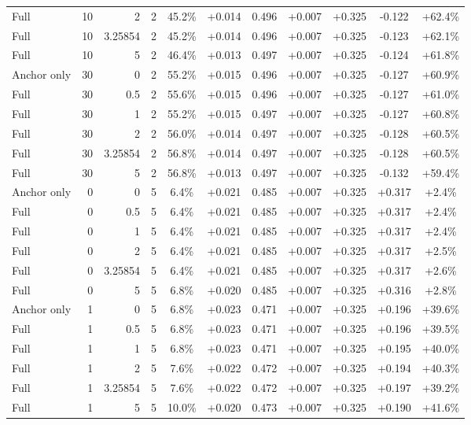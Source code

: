 \begin{table}[htbp]
\begin{tabular}{lrrrccccccc}
Full & 10 & 2 & 2 & 45.2\% & +0.014 & 0.496 & +0.007 & +0.325 & -0.122 & +62.4\% \\
Full & 10 & 3.25854 & 2 & 45.2\% & +0.014 & 0.496 & +0.007 & +0.325 & -0.123 & +62.1\% \\
Full & 10 & 5 & 2 & 46.4\% & +0.013 & 0.497 & +0.007 & +0.325 & -0.124 & +61.8\% \\
Anchor only & 30 & 0 & 2 & 55.2\% & +0.015 & 0.496 & +0.007 & +0.325 & -0.127 & +60.9\% \\
Full & 30 & 0.5 & 2 & 55.6\% & +0.015 & 0.496 & +0.007 & +0.325 & -0.127 & +61.0\% \\
Full & 30 & 1 & 2 & 55.2\% & +0.015 & 0.497 & +0.007 & +0.325 & -0.127 & +60.8\% \\
Full & 30 & 2 & 2 & 56.0\% & +0.014 & 0.497 & +0.007 & +0.325 & -0.128 & +60.5\% \\
Full & 30 & 3.25854 & 2 & 56.8\% & +0.014 & 0.497 & +0.007 & +0.325 & -0.128 & +60.5\% \\
Full & 30 & 5 & 2 & 56.8\% & +0.013 & 0.497 & +0.007 & +0.325 & -0.132 & +59.4\% \\
Anchor only & 0 & 0 & 5 & 6.4\% & +0.021 & 0.485 & +0.007 & +0.325 & +0.317 & +2.4\% \\
Full & 0 & 0.5 & 5 & 6.4\% & +0.021 & 0.485 & +0.007 & +0.325 & +0.317 & +2.4\% \\
Full & 0 & 1 & 5 & 6.4\% & +0.021 & 0.485 & +0.007 & +0.325 & +0.317 & +2.4\% \\
Full & 0 & 2 & 5 & 6.4\% & +0.021 & 0.485 & +0.007 & +0.325 & +0.317 & +2.5\% \\
Full & 0 & 3.25854 & 5 & 6.4\% & +0.021 & 0.485 & +0.007 & +0.325 & +0.317 & +2.6\% \\
Full & 0 & 5 & 5 & 6.8\% & +0.020 & 0.485 & +0.007 & +0.325 & +0.316 & +2.8\% \\
Anchor only & 1 & 0 & 5 & 6.8\% & +0.023 & 0.471 & +0.007 & +0.325 & +0.196 & +39.6\% \\
Full & 1 & 0.5 & 5 & 6.8\% & +0.023 & 0.471 & +0.007 & +0.325 & +0.196 & +39.5\% \\
Full & 1 & 1 & 5 & 6.8\% & +0.023 & 0.471 & +0.007 & +0.325 & +0.195 & +40.0\% \\
Full & 1 & 2 & 5 & 7.6\% & +0.022 & 0.472 & +0.007 & +0.325 & +0.194 & +40.3\% \\
Full & 1 & 3.25854 & 5 & 7.6\% & +0.022 & 0.472 & +0.007 & +0.325 & +0.197 & +39.2\% \\
Full & 1 & 5 & 5 & 10.0\% & +0.020 & 0.473 & +0.007 & +0.325 & +0.190 & +41.6\% \\

\end{tabular}
\end{table}
